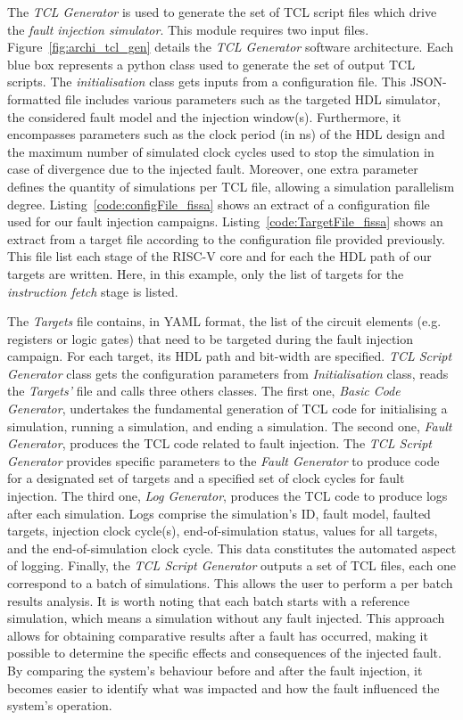 The \textit{TCL Generator} is used to generate the set of TCL script files which drive the \textit{fault injection simulator}. This module requires two input files.
Figure~\ref{fig:archi_tcl_gen} details the \textit{TCL Generator} software architecture. Each blue box represents a python class used to generate the set of output TCL scripts.
The \textit{initialisation} class gets inputs from a configuration file. This JSON-formatted file includes various parameters such as the targeted HDL simulator, the considered fault model and the injection window(s). Furthermore, it encompasses parameters such as the clock period (in ns) of the HDL design and the maximum number of simulated clock cycles used to stop the simulation in case of divergence due to the injected fault. Moreover, one extra parameter defines the quantity of simulations per TCL file, allowing a simulation parallelism degree.
Listing~\ref{code:configFile_fissa} shows an extract of a configuration file used for our fault injection campaigns.
Listing~\ref{code:TargetFile_fissa} shows an extract from a target file according to the configuration file provided previously. This file list each stage of the RISC-V core and for each the HDL path of our targets are written. Here, in this example, only the list of targets for the \textit{instruction fetch} stage is listed.

The \textit{Targets} file contains, in YAML format, the list of the circuit elements (e.g. registers or logic gates) that need to be targeted during the fault injection campaign. For each target, its HDL path and bit-width are specified.
\textit{TCL Script Generator} class gets the configuration parameters from \textit{Initialisation} class, reads the \textit{Targets'} file and calls three others classes.
The first one, \textit{Basic Code Generator}, undertakes the fundamental generation of TCL code for initialising a simulation, running a simulation, and ending a simulation.
The second one, \textit{Fault Generator}, produces the TCL code related to fault injection. The \textit{TCL Script Generator} provides specific parameters to the \textit{Fault Generator} to produce code for a designated set of targets and a specified set of clock cycles for fault injection.
The third one, \textit{Log Generator}, produces the TCL code to produce logs after each simulation.
Logs comprise the simulation's ID, fault model, faulted targets, injection clock cycle(s), end-of-simulation status, values for all targets, and the end-of-simulation clock cycle. This data constitutes the automated aspect of logging.
Finally, the \textit{TCL Script Generator} outputs a set of TCL files, each one correspond to a batch of simulations. This allows the user to perform a per batch results analysis. It is worth noting that each batch starts with a reference simulation, which means a simulation without any fault injected. This approach allows for obtaining comparative results after a fault has occurred, making it possible to determine the specific effects and consequences of the injected fault. By comparing the system's behaviour before and after the fault injection, it becomes easier to identify what was impacted and how the fault influenced the system's operation.

